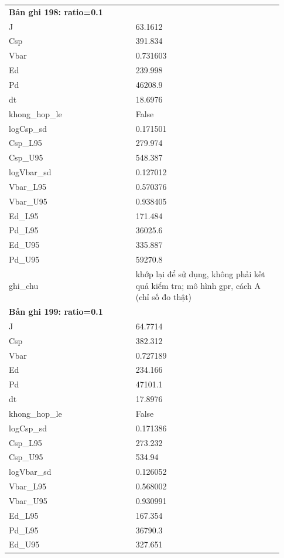 \begin{longtable}{p{0.43\linewidth}p{0.50\linewidth}}
\midrule
\multicolumn{2}{p{0.95\linewidth}}{\textbf{Bản ghi 198: ratio=0.1}} \\
J & 63.1612 \\
Csp & 391.834 \\
Vbar & 0.731603 \\
Ed & 239.998 \\
Pd & 46208.9 \\
dt & 18.6976 \\
khong\_\allowbreak hop\_\allowbreak le & False \\
logCsp\_\allowbreak sd & 0.171501 \\
Csp\_\allowbreak L95 & 279.974 \\
Csp\_\allowbreak U95 & 548.387 \\
logVbar\_\allowbreak sd & 0.127012 \\
Vbar\_\allowbreak L95 & 0.570376 \\
Vbar\_\allowbreak U95 & 0.938405 \\
Ed\_\allowbreak L95 & 171.484 \\
Pd\_\allowbreak L95 & 36025.6 \\
Ed\_\allowbreak U95 & 335.887 \\
Pd\_\allowbreak U95 & 59270.8 \\
ghi\_\allowbreak chu & khớp lại để sử dụng, không phải kết quả kiểm tra; mô hình gpr, cách A (chỉ số đo thật) \\
\midrule
\multicolumn{2}{p{0.95\linewidth}}{\textbf{Bản ghi 199: ratio=0.1}} \\
J & 64.7714 \\
Csp & 382.312 \\
Vbar & 0.727189 \\
Ed & 234.166 \\
Pd & 47101.1 \\
dt & 17.8976 \\
khong\_\allowbreak hop\_\allowbreak le & False \\
logCsp\_\allowbreak sd & 0.171386 \\
Csp\_\allowbreak L95 & 273.232 \\
Csp\_\allowbreak U95 & 534.94 \\
logVbar\_\allowbreak sd & 0.126052 \\
Vbar\_\allowbreak L95 & 0.568002 \\
Vbar\_\allowbreak U95 & 0.930991 \\
Ed\_\allowbreak L95 & 167.354 \\
Pd\_\allowbreak L95 & 36790.3 \\
Ed\_\allowbreak U95 & 327.651 \\

\end{longtable}
